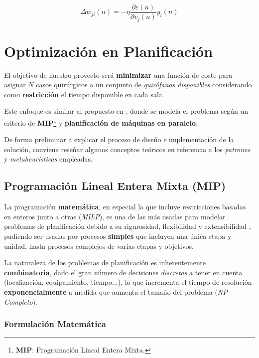 \begin{equation}
    \Delta w_{ji}(n) = -\eta \frac{\partial \varepsilon (n)}{\partial v_{j}(n)}y_{i}(n)
\end{equation}


\newpage

\section{Optimización en Planificación}

El objetivo de nuestro proyecto será \textbf{minimizar} una función de coste para asignar $N$ casos quirúrgicos a un conjunto de \textit{quirófanos disponibles} considerando como \textbf{restricción} el tiempo disponible en cada sala.

Este enfoque es similar al propuesto en \cite{Fei2008SolvingApproach}, donde se modela el problema según un criterio de \textbf{MIP}\footnote{\textbf{MIP}: Programación Lineal Entera Mixta.} y \textbf{planificación de máquinas en paralelo}.

De forma preliminar a explicar el proceso de diseño e implementación de la solución, conviene reseñar algunos conceptos teóricos en referencia a los \textit{patrones} y \textit{metaheurísticas}  empleadas.

\subsection{Programación Lineal Entera Mixta (MIP)}

La programación \textbf{matemática}, en especial la que incluye restricciones basadas en enteros junto a otras (\textit{MILP}), es una de las más usadas para modelar problemas de planificación debido a su rigurosidad, flexibilidad y extensibilidad \cite{Floudas2005MixedApplications}, pudiendo ser usadas por procesos \textbf{simples} que incluyen una única etapa y unidad, hasta procesos complejos de varias etapas y objetivos.

La naturaleza de los problemas de planificación es inherentemente \textbf{combinatoria}, dado el gran número de decisiones \textit{discretas} a tener en cuenta (localización, equipamiento, tiempo...), lo que incrementa el tiempo de resolución \textbf{exponencialmente} a medida que aumenta el tamaño del problema (\textit{NP-Completo}\cite{Garey1990ComputersNP-Completeness}).

\subsubsection{Formulación Matemática}

